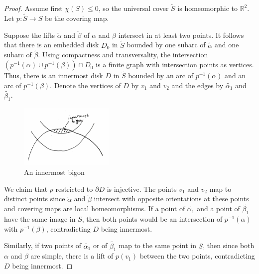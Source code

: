 \documentclass[reqno]{amsart}
\theoremstyle{definition}
\theoremstyle{remark}
\begin{document}
\begin{proof}
    Assume first
    $\chi (S) \le 0$, so the universal cover
    $\tilde{S}$ is homeomorphic to $\mathbb{R}^2$.
    Let $p \colon \tilde{S} \to S$ be the covering map.

    Suppose the lifts $\tilde{\alpha}$ and
    $\tilde{\beta}$ of $\alpha$ and
    $\beta$ intersect in at least two points. It
    follows that there is an embedded disk
    $D_0$ in $\tilde{S}$ bounded by one
    subarc of $\tilde{\alpha}$ and one subarc
    of $\tilde{\beta}$.
    Using compactness and transversality, the
    intersection
    $\left( p^{-1}\left( \alpha \right) 
    \cup p^{-1}\left( \beta \right) \right) 
    \cap D_0$ is a finite graph with intersection points
    as vertices. Thus, there is an innermost disk
    $D$ in $\tilde{S}$ bounded by
    an arc of $p^{-1}\left( \alpha \right) $ and
    an arc of $p^{-1}\left( \beta \right) $.
    Denote the vertices of $D$ by $v_1$ and $v_2$ and
    the edges by $\tilde{\alpha_1}$ and
    $\tilde{\beta_1}$.

    \begin{figure}[htpb]
        \centering
        \includegraphics[width=0.4\textwidth]{innermost-bigon.jpg}
        \caption{An innermost bigon}
        \label{fig:innermost-bigon-jpg}
    \end{figure}

    We claim that $p$ restricted to
    $\partial D$ is injective. 
    The points $v_1$ and $v_2$ map to distinct points since
    $\tilde{\alpha}$ and
    $\tilde{\beta}$ intersect with
    opposite orientations at these points and
    covering maps are local homeomorphisms. If a point of
    $\tilde{\alpha_1}$ and a point of
    $\tilde{\beta_1}$ have the same image in
    $S$, then both points would be an intersection of
    $p^{-1}\left( \alpha \right) $ with
    $p^{-1}\left( \beta \right) $, contradicting
    $D$ being innermost.

    Similarly, if two points of
    $\tilde{\alpha_1}$ or of
    $\tilde{\beta_1}$ map to the same point in $S$, then
    since both $\alpha$ and $\beta$ are simple,
    there is a lift of
    $p \left( v_1 \right) $ between the two points, contradicting
    $D$ being innermost.


\end{proof}
\end{document}
